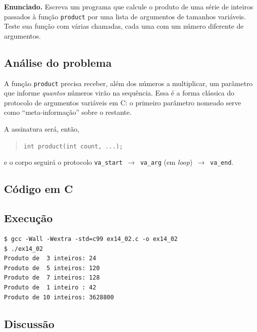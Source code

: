 \documentclass[11pt,a4paper]{article}
\begin{document}
\begin{enunciado}
\textbf{Enunciado.} Escreva um programa que calcule o produto de uma s\'erie de inteiros passados \`a fun\c{c}\~ao \texttt{product} por uma lista de argumentos de tamanhos vari\'aveis. Teste sua fun\c{c}\~ao com v\'arias chamadas, cada uma com um n\'umero diferente de argumentos.
\end{enunciado}

\subsection*{An\'alise do problema}

A fun\c{c}\~ao \texttt{product} precisa receber, al\'em dos n\'umeros a multiplicar, um par\^ametro que informe \emph{quantos} n\'umeros vir\~ao na sequ\^encia. Essa \'e a forma cl\'assica do protocolo de argumentos vari\'aveis em C: o primeiro par\^ametro nomeado serve como ``meta-informa\c{c}\~ao'' sobre o restante.

A assinatura ser\'a, ent\~ao,
\begin{quote}\texttt{int product(int count, ...);}\end{quote}
\noindent e o corpo seguir\'a o protocolo \texttt{va\_start}~$\rightarrow$~\texttt{va\_arg} (em \emph{loop})~$\rightarrow$~\texttt{va\_end}.

\subsection*{C\'odigo em C}



\subsection*{Execu\c{c}\~ao}

\begin{saidabox}
\begin{lstlisting}[style=terminal]
$ gcc -Wall -Wextra -std=c99 ex14_02.c -o ex14_02
$ ./ex14_02
Produto de  3 inteiros: 24
Produto de  5 inteiros: 120
Produto de  7 inteiros: 128
Produto de  1 inteiro : 42
Produto de 10 inteiros: 3628800
\end{lstlisting}
\end{saidabox}

\subsection*{Discuss\~ao}
\end{document}
